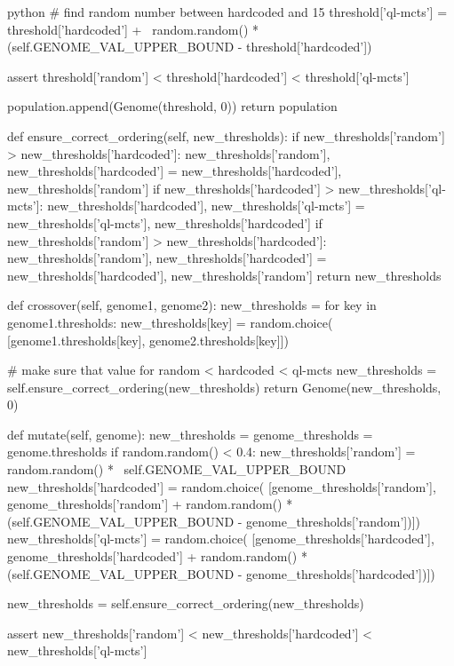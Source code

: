 \begin{mintedbox}{python}
            # find random number between hardcoded and 15
            threshold['ql-mcts'] = threshold['hardcoded'] + \
                random.random() * (self.GENOME_VAL_UPPER_BOUND -
                                    threshold['hardcoded'])

            assert threshold['random'] < threshold['hardcoded'] < threshold['ql-mcts']

            population.append(Genome(threshold, 0))
        return population

    def ensure_correct_ordering(self, new_thresholds):
        if new_thresholds['random'] > new_thresholds['hardcoded']:
            new_thresholds['random'], new_thresholds['hardcoded'] = new_thresholds['hardcoded'], new_thresholds['random']
        if new_thresholds['hardcoded'] > new_thresholds['ql-mcts']:
            new_thresholds['hardcoded'], new_thresholds['ql-mcts'] = new_thresholds['ql-mcts'], new_thresholds['hardcoded']
        if new_thresholds['random'] > new_thresholds['hardcoded']:
            new_thresholds['random'], new_thresholds['hardcoded'] = new_thresholds['hardcoded'], new_thresholds['random']
        return new_thresholds

    def crossover(self, genome1, genome2):
        new_thresholds = {}
        for key in genome1.thresholds:
            new_thresholds[key] = random.choice(
                [genome1.thresholds[key], genome2.thresholds[key]])

        # make sure that value for random < hardcoded < ql-mcts
        new_thresholds = self.ensure_correct_ordering(new_thresholds)
        return Genome(new_thresholds, 0)

    def mutate(self, genome):
        new_thresholds = {}
        genome_thresholds = genome.thresholds
        if random.random() < 0.4:
            new_thresholds['random'] = random.random() * \
                self.GENOME_VAL_UPPER_BOUND
            new_thresholds['hardcoded'] = random.choice(
                [genome_thresholds['random'], genome_thresholds['random'] +
                    random.random() * (self.GENOME_VAL_UPPER_BOUND - genome_thresholds['random'])])
            new_thresholds['ql-mcts'] = random.choice(
                [genome_thresholds['hardcoded'], genome_thresholds['hardcoded'] +
                    random.random() * (self.GENOME_VAL_UPPER_BOUND - genome_thresholds['hardcoded'])])

            new_thresholds = self.ensure_correct_ordering(new_thresholds)

            assert new_thresholds['random'] < new_thresholds['hardcoded'] < new_thresholds['ql-mcts']


\end{mintedbox}
